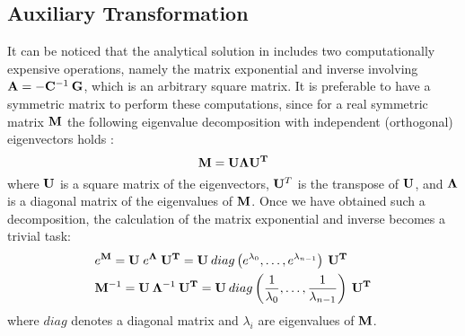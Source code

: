 \subsection{Auxiliary Transformation} \label{sec:ce-auxiliary}
It can be noticed that the analytical solution in  includes two computationally expensive operations, namely the matrix exponential and inverse involving \mbox{$\mathbf{A} = - \mathbf{C}^{-1} \: \mathbf{G}$}, which is an arbitrary square matrix. It is preferable to have a symmetric matrix to perform these computations, since for a real symmetric matrix $\mathbf{M}$ the following eigenvalue decomposition with independent (orthogonal) eigenvectors holds \cite{press2007}:
\begin{equation} \label{eq:eigenvalue-decomposition}
  \mathbf{M} = \mathbf{U} \mathbf{\Lambda} \mathbf{U}^{\mathbf{T}}
\end{equation}
where $\mathbf{U}$ is a square matrix of the eigenvectors, $\mathbf{U}^T$ is the transpose of $\mathbf{U}$, and $\mathbf{\Lambda}$ is a diagonal matrix of the eigenvalues of $\mathbf{M}$. Once we have obtained such a decomposition, the calculation of the matrix exponential and inverse becomes a trivial task:
\begin{align*}
  & e^{\mathbf{M}} = \mathbf{U} \; e^{\mathbf{\Lambda}} \; \mathbf{U}^{\mathbf{T}} = \mathbf{U} \: diag \left( e^{\lambda_0}, \dots, e^{\lambda_{n - 1}} \right) \: \mathbf{U}^{\mathbf{T}} \\
  & \mathbf{M}^{-1} = \mathbf{U} \: \mathbf{\Lambda}^{-1} \: \mathbf{U}^{\mathbf{T}} = \mathbf{U} \: diag \left( \frac{1}{\lambda_0}, \dots, \frac{1}{\lambda_{n - 1}} \right) \: \mathbf{U}^{\mathbf{T}} \\
\end{align*}
where $diag$ denotes a diagonal matrix and $\lambda_i$ are eigenvalues of $\mathbf{M}$.

